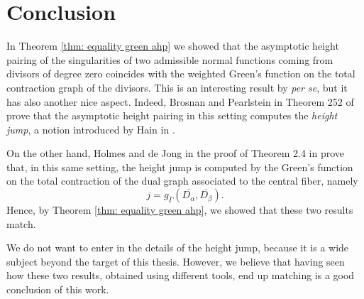\documentclass[a4paper,12 pt,titlepage,twoside]{book}
\theoremstyle{plain}
\theoremstyle{theorem}
\theoremstyle{definition}
\theoremstyle{remark}
\begin{document}
	\section{Conclusion}\label{sec: conclusion}
	In Theorem \ref{thm: equality green ahp} we showed that the asymptotic height pairing of the singularities of two admissible normal functions coming from divisors of degree zero coincides with the weighted Green's function on the total contraction graph of the divisors. This is an interesting result by \emph{per se}, but it has also another nice aspect.
	Indeed, Brosnan and Pearlstein in Theorem 252 of \cite{MR3983292} prove that the asymptotic height pairing in this setting computes the \emph{height jump}, a notion introduced by Hain in \cite{MR3184171}. 
	
	On the other hand, Holmes and de Jong in the proof of Theorem 2.4 in \cite{MR3488379} prove that, in this same setting, the height jump is computed by the Green's function on the total contraction of the dual graph associated to the central fiber, namely $$j = g_{\overline{\Gamma}}(\overline{D_\alpha}, \overline{D_\beta}).$$ Hence, by Theorem \ref{thm: equality green ahp}, we showed that these two results match.
	
	We do not want to enter in the details of the height jump, because it is a wide subject beyond the target of this thesis. However, we believe that having seen how these two results, obtained using different tools, end up matching is a good conclusion of this work.

	\newpage
	
	
	
	
\end{document}

